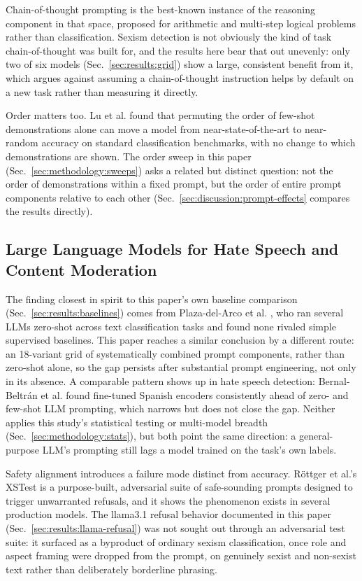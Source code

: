 Chain-of-thought prompting \cite{wei2022chain} is the best-known instance
of the reasoning component in that space, proposed for arithmetic and
multi-step logical problems rather than classification. Sexism detection
is not obviously the kind of task chain-of-thought was built for, and the
results here bear that out unevenly: only two of six models
(Sec.~\ref{sec:results:grid}) show a large, consistent benefit from it,
which argues against assuming a chain-of-thought instruction helps by
default on a new task rather than measuring it directly.

Order matters too. Lu et al. \cite{lu2022fantastically} found that
permuting the order of few-shot demonstrations alone can move a model from
near-state-of-the-art to near-random accuracy on standard classification
benchmarks, with no change to which demonstrations are shown. The order
sweep in this paper (Sec.~\ref{sec:methodology:sweeps}) asks a related but
distinct question: not the order of demonstrations within a fixed prompt,
but the order of entire prompt components relative to each other
(Sec.~\ref{sec:discussion:prompt-effects} compares the results directly).

\subsection{Large Language Models for Hate Speech and Content Moderation}
\label{sec:related:llm-moderation}

The finding closest in spirit to this paper's own baseline comparison
(Sec.~\ref{sec:results:baselines}) comes from Plaza-del-Arco et al.
\cite{plazadelarco2023label}, who ran several LLMs zero-shot across text
classification tasks and found none rivaled simple supervised baselines.
This paper reaches a similar conclusion by a different route: an
18-variant grid of systematically combined prompt components, rather
than zero-shot alone, so the gap persists after substantial prompt
engineering, not only in its absence. A comparable pattern shows up in
hate speech detection: Bernal-Beltr\'an et al.
\cite{bernalbeltran2025spanish} found fine-tuned Spanish encoders
consistently ahead of zero- and few-shot LLM prompting, which narrows
but does not close the gap. Neither applies this study's statistical
testing or multi-model breadth (Sec.~\ref{sec:methodology:stats}), but
both point the same direction: a general-purpose LLM's prompting still
lags a model trained on the task's own labels.

Safety alignment introduces a failure mode distinct from accuracy.
R\"ottger et al.'s XSTest \cite{rottger2023xstest} is a purpose-built,
adversarial suite of safe-sounding prompts designed to trigger unwarranted
refusals, and it shows the phenomenon exists in several production models.
The llama3.1 refusal behavior documented in this paper
(Sec.~\ref{sec:results:llama-refusal}) was not sought out through an
adversarial test suite: it surfaced as a byproduct of ordinary sexism
classification, once role and aspect framing were dropped from the
prompt, on genuinely sexist and non-sexist text rather than deliberately
borderline phrasing.

